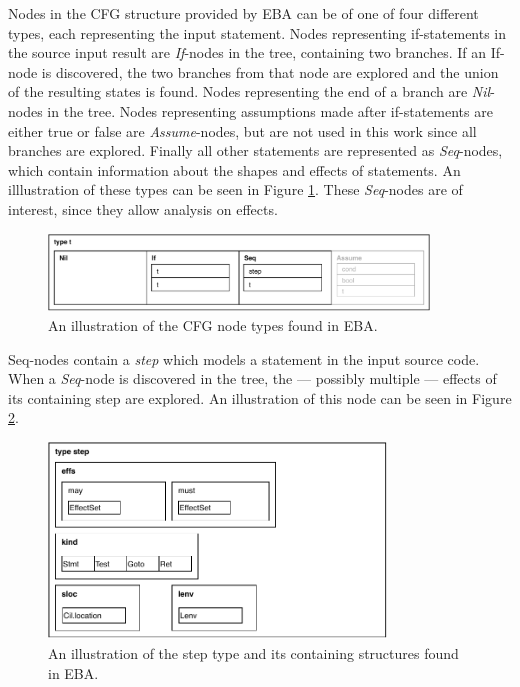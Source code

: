 \newpar Nodes in the CFG structure provided by EBA can be of one of four different types, each representing the input statement. Nodes representing if-statements in the source input result are \textit{If}-nodes in the tree, containing two branches. If an If-node is discovered, the two branches from that node are explored and the union of the resulting states is found. Nodes representing the end of a branch are \textit{Nil}-nodes in the tree. Nodes representing assumptions made after if-statements are either true or false are \textit{Assume}-nodes, but are not used in this work since all branches are explored. Finally all other statements are represented as \textit{Seq}-nodes, which contain information about the shapes and effects of statements. An illlustration of these types can be seen in Figure \ref{cfg-nodes}. These \textit{Seq}-nodes are of interest, since they allow analysis on effects.  


\begin{figure}[H]
    \centering
    \includegraphics[width=0.9\textwidth]{implementation/figures/node}
    \caption{An illustration of the CFG node types found in EBA.}
    \label{cfg-nodes}
\end{figure}

\newpar Seq-nodes contain a \textit{step} which models a statement in the input source code. When a \textit{Seq}-node is discovered in the tree, the --- possibly multiple --- effects of its containing step are explored. An illustration of this node can be seen in Figure \ref{cfg-step}. 


\begin{figure}[H]
    \centering
    \includegraphics[width=0.8\textwidth]{implementation/figures/step}
    \caption{An illustration of the step type and its containing structures found in EBA.}
    \label{cfg-step}
\end{figure}

